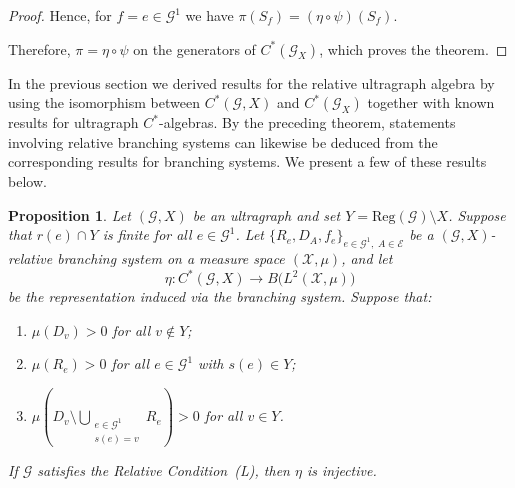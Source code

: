 \documentclass[12pt, reqno]{amsart}
\newtheorem{proposition}[theorem]{Proposition}
\theoremstyle{definition}
\theoremstyle{remark}
\numberwithin{equation}{section}
\begin{document}
\begin{proof}
Hence, for $f=e \in \mathcal{G}^1$ we have $\pi(S_f)=(\eta \circ \psi)(S_f)$.

Therefore, $\pi=\eta \circ \psi$ on the generators of $C^*(\mathcal{G}_X)$, which proves the theorem.
\end{proof}


In the previous section we derived results for the relative ultragraph algebra by using the
isomorphism between $C^*(\mathcal{G},X)$ and $C^*(\mathcal{G}_X)$ together with known results
for ultragraph $C^*$-algebras. By the preceding theorem, statements involving relative branching
systems can likewise be deduced from the corresponding results for branching systems. We present a few of these results below.

\begin{proposition}\label{injectivitybscondL}
Let $(\mathcal{G}, X)$ be an ultragraph and set $Y=\mathrm{Reg}(\mathcal{G})\setminus X$.
Suppose that $r(e) \cap Y$ is finite for all $e \in \mathcal{G}^1$. Let
$\{R_e,D_A,f_e\}_{e\in \mathcal{G}^1,\; A\in \mathcal{E}}$ be a $(\mathcal{G}, X)$-relative
branching system on a measure space $(\mathcal{X},\mu)$, and let
\[
\eta: C^*(\mathcal{G},X) \longrightarrow B\!\bigl(L^2(\mathcal{X},\mu)\bigr)
\]
be the representation induced via the branching system. Suppose that:
\begin{enumerate}
    \item $\mu(D_v) > 0$ for all $v \notin Y$;
    \item $\mu(R_e) > 0$ for all $e \in \mathcal{G}^1$ with $s(e) \in Y$;
    \item $\mu\!\left( D_v \setminus \bigcup_{\substack{e \in \mathcal{G}^1\\ s(e)=v}} R_e \right) > 0$
    for all $v \in Y$.
\end{enumerate}
If $\mathcal{G}$ satisfies the Relative Condition~(L), then $\eta$ is injective.
\end{proposition}
\end{document}
